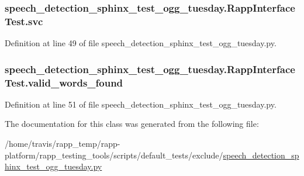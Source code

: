 \hypertarget{classspeech__detection__sphinx__test__ogg__tuesday_1_1RappInterfaceTest_a4f078c965b812d31086c0f1d2e2c998f}{
\subsubsection[{svc}]{\setlength{\rightskip}{0pt plus 5cm}speech\-\_\-detection\-\_\-sphinx\-\_\-test\-\_\-ogg\-\_\-tuesday.\-Rapp\-Interface\-Test.\-svc}}\label{classspeech__detection__sphinx__test__ogg__tuesday_1_1RappInterfaceTest_a4f078c965b812d31086c0f1d2e2c998f}


Definition at line 49 of file speech\-\_\-detection\-\_\-sphinx\-\_\-test\-\_\-ogg\-\_\-tuesday.\-py.

\hypertarget{classspeech__detection__sphinx__test__ogg__tuesday_1_1RappInterfaceTest_a15fe3dc88f2c454ab1da9cf27c3dbe11}{
\subsubsection[{valid\-\_\-words\-\_\-found}]{\setlength{\rightskip}{0pt plus 5cm}speech\-\_\-detection\-\_\-sphinx\-\_\-test\-\_\-ogg\-\_\-tuesday.\-Rapp\-Interface\-Test.\-valid\-\_\-words\-\_\-found}}\label{classspeech__detection__sphinx__test__ogg__tuesday_1_1RappInterfaceTest_a15fe3dc88f2c454ab1da9cf27c3dbe11}


Definition at line 51 of file speech\-\_\-detection\-\_\-sphinx\-\_\-test\-\_\-ogg\-\_\-tuesday.\-py.



The documentation for this class was generated from the following file\-:\begin{DoxyCompactItemize}
\item 
/home/travis/rapp\-\_\-temp/rapp-\/platform/rapp\-\_\-testing\-\_\-tools/scripts/default\-\_\-tests/exclude/\hyperlink{speech__detection__sphinx__test__ogg__tuesday_8py}{speech\-\_\-detection\-\_\-sphinx\-\_\-test\-\_\-ogg\-\_\-tuesday.\-py}\end{DoxyCompactItemize}
